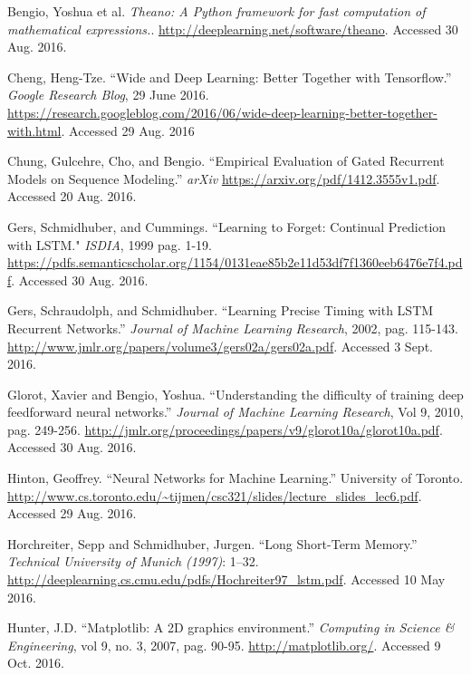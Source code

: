 \documentclass[12pt, titlepage]{article}
\begin{document}
\newpage
\renewcommand{\refname}{Works Cited}
\begin{thebibliography}{9}
		Bengio, Yoshua et al. \textit{Theano: A Python framework for fast
		computation of mathematical expressions.}.
		\url{http://deeplearning.net/software/theano}. Accessed 30 Aug. 2016.

		Cheng, Heng-Tze. ``Wide and Deep Learning: Better Together with
		Tensorflow.'' \textit{Google Research Blog}, 29 June 2016.
		\url{https://research.googleblog.com/2016/06/wide-deep-learning-better-together-with.html}.
		Accessed 29 Aug. 2016

		Chung, Gulcehre, Cho, and Bengio. ``Empirical Evaluation of Gated
		Recurrent Models on Sequence Modeling.'' \textit{arXiv}
		\url{https://arxiv.org/pdf/1412.3555v1.pdf}. Accessed 20 Aug. 2016.

		Gers, Schmidhuber, and Cummings. ``Learning to Forget: Continual
		Prediction with LSTM." \textit{ISDIA}, 1999 pag. 1-19.
		\url{https://pdfs.semanticscholar.org/1154/0131eae85b2e11d53df7f1360eeb6476e7f4.pdf}.
		Accessed 30 Aug. 2016.

		Gers, Schraudolph, and Schmidhuber. ``Learning Precise Timing with LSTM
		Recurrent Networks.'' \textit{Journal of Machine Learning Research},
		2002, pag. 115-143.
		\url{http://www.jmlr.org/papers/volume3/gers02a/gers02a.pdf}. Accessed 3
		Sept. 2016.

		Glorot, Xavier and Bengio, Yoshua. ``Understanding the difficulty of
		training deep feedforward neural networks.'' \textit{Journal of Machine
		Learning Research}, Vol 9, 2010, pag. 249-256.
		\url{http://jmlr.org/proceedings/papers/v9/glorot10a/glorot10a.pdf}.
		Accessed 30 Aug. 2016.

		Hinton, Geoffrey. ``Neural Networks for Machine Learning.'' University
		of Toronto.
		\url{http://www.cs.toronto.edu/~tijmen/csc321/slides/lecture_slides_lec6.pdf}.
		Accessed 29 Aug. 2016.

		Horchreiter, Sepp and Schmidhuber, Jurgen. ``Long Short-Term Memory.''
		\textit{Technical University of Munich (1997)}: 1--32.
		\url{http://deeplearning.cs.cmu.edu/pdfs/Hochreiter97_lstm.pdf}.
		Accessed 10 May 2016.

		Hunter, J.D. ``Matplotlib: A 2D graphics environment.''
		\textit{Computing in Science \& Engineering}, vol 9, no. 3, 2007, pag.
		90-95. \url{http://matplotlib.org/}. Accessed 9 Oct.  2016.


\end{thebibliography}
\end{document}

